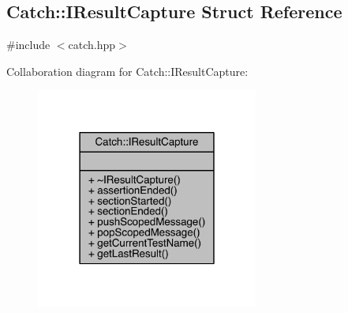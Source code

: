 \hypertarget{a00040}{}\subsection{Catch\+:\+:I\+Result\+Capture Struct Reference}
\label{a00040}


{\ttfamily \#include $<$catch.\+hpp$>$}



Collaboration diagram for Catch\+:\+:I\+Result\+Capture\+:\nopagebreak
\begin{figure}[H]
\begin{center}
\leavevmode
\includegraphics[width=207pt]{a00214}
\end{center}
\end{figure}
